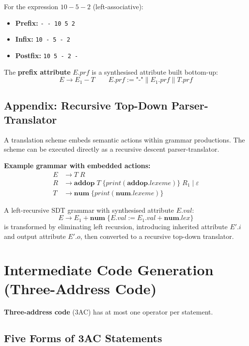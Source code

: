 \documentclass[12pt,a4paper]{article}
\begin{document}
For the expression $10 - 5 - 2$ (left-associative):
\begin{itemize}
  \item \textbf{Prefix:} \texttt{- - 10 5 2}
  \item \textbf{Infix:}  \texttt{10 - 5 - 2}
  \item \textbf{Postfix:} \texttt{10 5 - 2 -}
\end{itemize}

The \textbf{prefix attribute} $E.\textit{prf}$ is a synthesised attribute built bottom-up:
\[
E \to E_1 - T \qquad E.\textit{prf} := \texttt{"-"} \mathbin{\|} E_1.\textit{prf} \mathbin{\|} T.\textit{prf}
\]

\subsection{Appendix: Recursive Top-Down Parser-Translator}

A translation scheme embeds semantic actions within grammar productions.
The scheme can be executed directly as a recursive descent parser-translator.

\textbf{Example grammar with embedded actions:}
\begin{align*}
E  &\to T\; R\\
R  &\to \mathbf{addop}\; T\; \{\textit{print}(\mathbf{addop}.\textit{lexeme})\}\; R_1 \mid \varepsilon\\
T  &\to \mathbf{num}\; \{\textit{print}(\mathbf{num}.\textit{lexeme})\}
\end{align*}

A left-recursive SDT grammar with synthesised attribute $E.\mathit{val}$:
\[
E \to E_1 + \mathbf{num} \;\{E.\mathit{val} := E_1.\mathit{val} + \mathbf{num}.\mathit{lex}\}
\]
is transformed by eliminating left recursion, introducing inherited attribute $E'.\mathit{i}$
and output attribute $E'.\mathit{o}$, then converted to a recursive top-down translator.

\section{Intermediate Code Generation (Three-Address Code)}

\textbf{Three-address code} (3AC) has at most one operator per statement.

\subsection{Five Forms of 3AC Statements}
\end{document}
